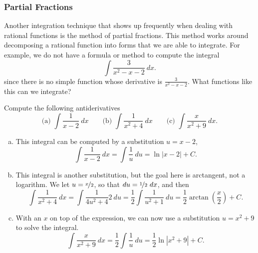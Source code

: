 \subsubsection{Partial Fractions}

Another integration technique that shows up frequently when dealing with rational functions is the method of partial fractions. This method works around decomposing a rational function into forms that we are able to integrate. For example, we do not have a formula or method to compute the integral
\begin{equation*}
\int \frac{3}{x^2 - x - 2} \ dx.
\end{equation*}
since there is no simple function whose derivative is $\frac{3}{x^2 - x - 2}$. What functions like this can we integrate?

\begin{example} \label{ex:PFPossible}
Compute the following antiderivatives
\begin{equation*}
\text{(a) } \int \frac{1}{x-2} \ dx \qquad \text{(b) } \int \frac{1}{x^2 + 4}\ dx \qquad \text{(c) } \int \frac{x}{x^2 + 9}\ dx.
\end{equation*}
\end{example}

\begin{exampleSol}
\begin{enumerate}[(a)]
\item This integral can be computed by a substitution $u = x-2$,
\begin{equation*}
\int \frac{1}{x-2}\ dx = \int \frac{1}{u}\ du = \ln|x-2| + C.
\end{equation*}
\item This integral is another substitution, but the goal here is arctangent, not a logarithm. We let $u = \nicefrac{x}{2}$, so that $du = \nicefrac{1}{2}\ dx$, and then 
\begin{equation*}
\int \frac{1}{x^2 + 4}\ dx = \int \frac{1}{4u^2 + 4} 2\ du = \frac{1}{2} \int \frac{1}{u^2 + 1}\ du = \frac{1}{2} \arctan\left( \frac{x}{2} \right) + C.
\end{equation*}
\item With an $x$ on top of the expression, we can now use a substitution $u = x^2 + 9$ to solve the integral.
\begin{equation*}
\int \frac{x}{x^2 + 9}\ dx = \frac{1}{2} \int \frac{1}{u}\ du = \frac{1}{2} \ln|x^2 + 9| + C.
\end{equation*}
\end{enumerate}
\end{exampleSol}

